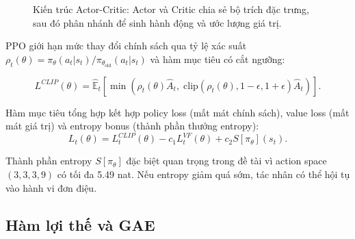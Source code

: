 \begin{figure}[H]
\centering
{}
\caption{Kiến trúc Actor-Critic: Actor và Critic chia sẻ bộ trích đặc trưng, sau đó phân nhánh để sinh hành động và ước lượng giá trị.}
\label{fig:actor_critic}
\end{figure}

PPO giới hạn mức thay đổi chính sách qua tỷ lệ xác suất $\rho_t(\theta) = \pi_\theta(a_t|s_t) / \pi_{\theta_\text{old}}(a_t|s_t)$ và hàm mục tiêu có cắt ngưỡng:

\begin{equation} \label{eq:ppo_clip}
    L^{CLIP}(\theta) =
    \hat{\mathbb{E}}_t
    \left[
    \min
    \left(
    \rho_t(\theta)\hat{A}_t,\;
    \mathrm{clip}(\rho_t(\theta),1-\epsilon,1+\epsilon)\hat{A}_t
    \right)
    \right].
\end{equation}

Hàm mục tiêu tổng hợp kết hợp policy loss (mất mát chính sách), value loss (mất mát giá trị) và entropy bonus (thành phần thưởng entropy):
\begin{equation} \label{eq:ppo_total}
    L_t(\theta) = L_t^{CLIP}(\theta) - c_1 L_t^{VF}(\theta) + c_2 S[\pi_\theta](s_t).
\end{equation}

Thành phần entropy $S[\pi_\theta]$ đặc biệt quan trọng trong đề tài vì action space $(3,3,3,9)$ có tối đa 5.49 nat. Nếu entropy giảm quá sớm, tác nhân có thể hội tụ vào hành vi đơn điệu.

\subsection{Hàm lợi thế và GAE}


